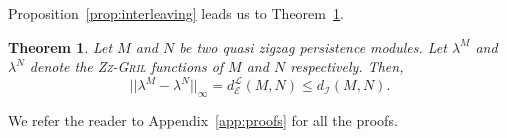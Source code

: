 \documentclass{article}
\newcommand{\zzgril}{\textsc{Zz-Gril}}
\newcommand{\qzzmod}{quasi zigzag persistence module}
\newcommand{\RKG}{\mathsf{rk}}
\newcommand{\zz}{\mathbb{ZZ}}
\newcommand{\z}{\mathbb{Z}}
\renewcommand{\varprojlim}{\mathsf{lim}}
\renewcommand{\varinjlim}{\mathsf{colim}}
\theoremstyle{plain}
\newtheorem{theorem}{Theorem}[section]
\newtheorem{corollary}[theorem]{Corollary}
\theoremstyle{definition}
\theoremstyle{remark}
\begin{document}
 Proposition~\ref{prop:interleaving} leads us to Theorem~\ref{thm:stability_zzgril}.

    


\begin{theorem}\label{thm:stability_zzgril}
    Let $M$ and $N$ be two \qzzmod s. Let $\lambda^M$ and $\lambda^N$ denote the \zzgril{} functions of $M$ and $N$  respectively. Then, 
    \begin{equation*}
        ||\lambda^M - \lambda^N||_\infty = d_\mathcal{E}^{\mathcal{L}}(M,N) \leq d_\mathcal{I}(M,N).
    \end{equation*}
\end{theorem}

    


We refer the reader to Appendix~\ref{app:proofs} for all the proofs.

\end{document}
